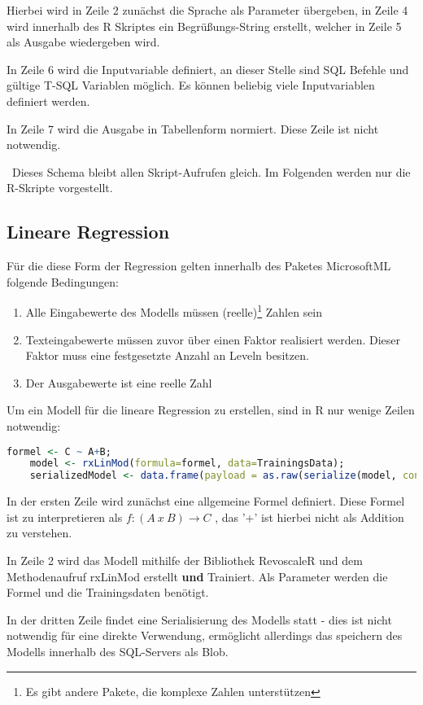 Hierbei wird in Zeile 2 zunächst die Sprache als Parameter übergeben, in Zeile 4 wird innerhalb des R Skriptes ein Begrüßungs-String erstellt, welcher in Zeile 5 als Ausgabe wiedergeben wird.

In Zeile 6 wird die Inputvariable definiert, an dieser Stelle sind SQL Befehle und gültige T-SQL Variablen möglich. Es können beliebig viele Inputvariablen definiert werden. 

In Zeile 7 wird die Ausgabe in Tabellenform normiert. Diese Zeile ist nicht notwendig.  

~\newline Dieses Schema bleibt allen Skript-Aufrufen gleich. Im Folgenden werden nur die R-Skripte vorgestellt.
\subsection{Lineare Regression}
Für die diese Form der Regression gelten innerhalb des Paketes MicrosoftML folgende Bedingungen: ~\newline
\begin{enumerate}
	\item Alle Eingabewerte des Modells müssen (reelle)\footnote{Es gibt andere Pakete, die komplexe Zahlen unterstützen} Zahlen sein
	\item Texteingabewerte müssen zuvor über einen Faktor realisiert werden. Dieser Faktor muss eine festgesetzte Anzahl an Leveln besitzen. 
	\item Der Ausgabewerte ist eine reelle Zahl 
\end{enumerate}

Um ein Modell für die lineare Regression zu erstellen, sind in R nur wenige Zeilen notwendig: ~\newline
\begin{lstlisting}[language=R]
	formel <- C ~ A+B;
	model <- rxLinMod(formula=formel, data=TrainingsData);
	serializedModel <- data.frame(payload = as.raw(serialize(model, connection=null)));
\end{lstlisting}

In der ersten Zeile wird zunächst eine allgemeine Formel definiert. Diese Formel ist zu interpretieren als $f: (A~x~B)\rightarrow C $ , das '+' ist hierbei nicht als Addition zu verstehen.

In Zeile 2 wird das Modell mithilfe der Bibliothek RevoscaleR und dem Methodenaufruf rxLinMod erstellt \textbf{und} Trainiert. Als Parameter werden die Formel und die Trainingsdaten benötigt. 

In der dritten Zeile findet eine Serialisierung des Modells statt - dies ist nicht notwendig für eine direkte Verwendung, ermöglicht allerdings das speichern des Modells innerhalb des SQL-Servers als Blob.  

